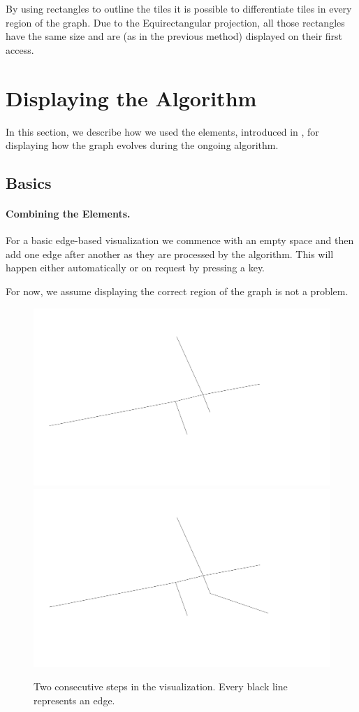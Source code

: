 \documentclass
[
    paper = a4,
    pagesize,
    12 pt,
    oneside,                       %
    open = right,
    DIV = calc,
    BCOR = 0 mm,                   %
    bibtotoc
]
{scrbook}
\begin{document}
By using rectangles to outline the tiles it is possible to differentiate tiles in every region of the graph.
Due to the Equirectangular projection, all those rectangles have the same size and are (as in the previous method) displayed on their first access.


\section{Displaying the Algorithm} \label{algorithm}

In this section, we describe how we used the elements, introduced in , for displaying how the graph evolves during the ongoing algorithm.

\subsection{Basics} \label{basic}

\paragraph{Combining the Elements.}

For a basic edge-based visualization we commence with an empty space and then add one edge after another as they are processed by the algorithm.
This will happen either automatically or on request by pressing a key.

For now, we assume displaying the correct region of the graph is not a problem.

\begin{figure}
    \includegraphics[width=.5\textwidth]{Images/vis-step-one.png}
    \includegraphics[width=.5\textwidth]{Images/vis-step-two.png}
\caption{Two consecutive steps in the visualization. Every black line represents an edge.}
\label{fig:two-steps}
\end{figure}
\end{document}
